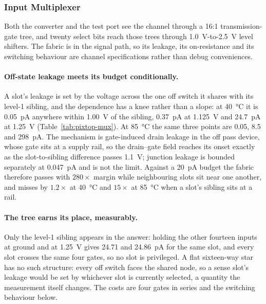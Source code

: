 \subsubsection{Input Multiplexer}\label{sss:pixtop-mux}

Both the converter and the test port see the channel through a 16:1
transmission-gate tree, and twenty select bits reach those trees through
\SI{1.0}{\volt}-to-\SI{2.5}{\volt} level shifters. The fabric is in the signal
path, so its leakage, its on-resistance and its switching behaviour are channel
specifications rather than debug conveniences.

\paragraph{Off-state leakage meets its budget conditionally.} A slot's leakage
is set by the voltage across the one off switch it shares with its level-1
sibling, and the dependence has a knee rather than a slope: at \SI{40}{\celsius}
it is \SI{0.05}{\pico\ampere} anywhere within \SI{1.00}{\volt} of the sibling,
\SI{0.37}{\pico\ampere} at \SI{1.125}{\volt} and \SI{24.7}{\pico\ampere} at
\SI{1.25}{\volt} (Table~\ref{tab:pixtop-mux}). At \SI{85}{\celsius} the same
three points are \num{0.05}, \num{8.5} and \SI{298}{\pico\ampere}. The
mechanism is gate-induced drain leakage in the off pass device, whose gate sits
at a supply rail, so the drain--gate field reaches its onset exactly as the
slot-to-sibling difference passes \SI{1.1}{\volt}; junction leakage is bounded
separately at \SI{0.047}{\pico\ampere} and is not the limit. Against a
\SI{20}{\pico\ampere} budget the fabric therefore passes with \(280\times\)
margin while neighbouring slots sit near one another, and misses by
\(1.2\times\) at \SI{40}{\celsius} and \(15\times\) at \SI{85}{\celsius} when a
slot's sibling sits at a rail.

\paragraph{The tree earns its place, measurably.} Only the level-1 sibling
appears in the answer: holding the other fourteen inputs at ground and at
\SI{1.25}{\volt} gives \num{24.71} and \SI{24.86}{\pico\ampere} for the same
slot, and every slot crosses the same four gates, so no slot is privileged. A
flat sixteen-way star has no such structure: every off switch faces the
shared node, so a sense slot's leakage would be set by whichever slot is
currently selected, a quantity the measurement itself changes. The costs are
four gates in series and the switching behaviour below.

